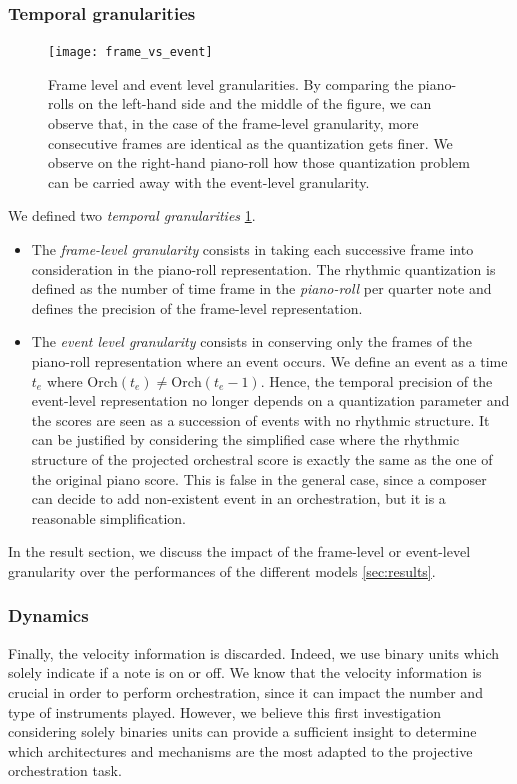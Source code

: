\documentclass{article}
\begin{document}
\subsubsection{Temporal granularities}
 \begin{figure}
\centering
\texttt{[image: frame\_vs\_event]}
\caption{Frame level and event level granularities. By comparing the piano-rolls on the left-hand side and the middle of the figure, we can observe that, in the case of the frame-level granularity, more consecutive frames are identical as the quantization gets finer. We observe on the right-hand piano-roll how those quantization problem can be carried away with the event-level granularity.}
\label{fig:frame_vs_event}
\end{figure}
We defined two \textit{temporal granularities} \ref{fig:frame_vs_event}.
\begin{itemize}
\item The \textit{frame-level granularity} consists in taking each successive frame into consideration in the piano-roll representation. The rhythmic quantization is defined as the number of time frame in the \textit{piano-roll} per quarter note and defines the precision of the frame-level representation.
\item The \textit{event level granularity} consists in conserving only the frames of the piano-roll representation where an event occurs. We define an event as a time $t_{e}$ where $\text{Orch}(t_{e}) \neq \text{Orch}(t_{e} - 1)$.  
Hence, the temporal precision of the event-level representation no longer depends on a quantization parameter and the scores are seen as a succession of events with no rhythmic structure.
It can be justified by considering the simplified case where the rhythmic structure of the projected orchestral score is exactly the same as the one of the original piano score. 
This is false in the general case, since a composer can decide to add non-existent event in an orchestration, but it is a reasonable simplification.
\end{itemize}
In the result section, we discuss the impact of the frame-level or event-level granularity over the performances of the different models \ref{sec:results}.

\subsubsection{Dynamics}
Finally, the velocity information is discarded. Indeed, we use binary units which solely indicate if a note is on or off. We know that the velocity information is crucial in order to perform orchestration, since it can impact the number and type of instruments played. However, we believe this first investigation considering solely binaries units can provide a sufficient insight to determine which architectures and mechanisms are the most adapted to the projective orchestration task.
\end{document}
